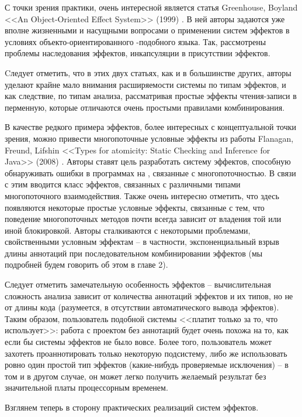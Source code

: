 С точки зрения практики, очень интересной является статья Greenhouse, Boyland <<An Object-Oriented Effect System>> (1999) \cite{Green99}. В ней авторы задаются уже вполне жизненными и насущными вопросами о применении систем эффектов в условиях объекто-ориентированного -подобного языка. Так, рассмотрены проблемы наследования эффектов, инкапсуляции в присутствии эффектов.

Cледует отметить, что в этих двух статьях, как и в большинстве других, авторы уделают крайне мало внимания расширяемости системы по типам эффектов, и как следствие, по типам анализа, рассматривая простые  эффекты чтения-записи в перменную, которые отличаются очень простыми правилами комбинирования.

В качестве редкого примера эффектов, более интересных с концептуальной точки зрения, можно привести многопоточные условные эффекты из работы Flanagan, Freund, Lifshin <<Types for atomicity: Static Checking and Inference for Java>> (2008) \cite{Flanagan08}. Авторы ставят цель разработать систему эффектов, способную обнаруживать ошибки в программах на , связанные с многопоточностью. В связи с этим вводится класс эффектов, связанных с различными типами многопоточного взаимодействия. Также очень интересно отметить, что здесь появляются некоторые простые условные эффекты, связанные с тем, что поведение многопоточных методов почти всегда зависит от владения той или иной блокировкой. Авторы сталкиваются с некоторыми проблемами, свойственными условным эффектам -- в частности, экспоненциальный взрыв длины аннотаций при последовательном комбинировании эффектов (мы подробней будем говорить об этом в главе 2).

Следует отметить замечательную особенность эффектов -- вычислительная сложность анализа зависит от количества аннотаций эффектов и их типов, но не от длины кода (разумеется, в отсутствии автоматического вывода эффектов). Таким образом, пользователь подобной системы <<платит только за то, что использует>>: работа с проектом без аннотаций будет очень похожа на то, как если бы системы эффектов не было вовсе. Более того, пользователь может захотеть проаннотировать только некоторую подсистему, либо же использовать ровно один простой тип эффектов (какие-нибудь проверяемые исключения) -- в том и в другом случае, он может легко получить желаемый результат без значительной платы процессорным временем.


\bigskip

Взглянем теперь в сторону практических реализаций систем эффектов.

